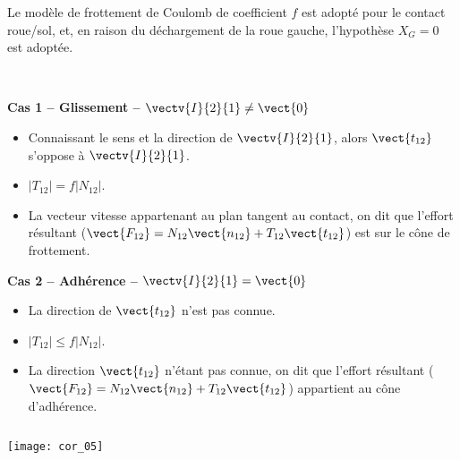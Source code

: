 \ifprof
\else
Le modèle de frottement de Coulomb de coefficient $f$ est adopté pour le contact roue/sol, et, en raison du déchargement de la roue gauche, l’hypothèse $X_G = 0$ est adoptée.
\fi

\ifprof
\begin{corrige}~\\

\noindent\begin{minipage}[t]{.33\linewidth}
\begin{center}
\textbf{Cas 1 -- Glissement -- $\vectv{I}{2}{1}\neq \vect{0}$}
\end{center}

\begin{itemize}
\item Connaissant le sens et la direction de $\vectv{I}{2}{1}$, alors $\vect{t_{12}}$ s'oppose à $\vectv{I}{2}{1}$.
\item $|T_{12}| = f |N_{12}|$.
\item La vecteur vitesse appartenant au plan tangent au contact, on dit que l'effort résultant ($\vect{F_{12}}=N_{12} \vect{n_{12}}+T_{12} \vect{t_{12}}$) est sur le cône de frottement. 
\end{itemize}
\end{minipage}\hfill
\begin{minipage}[t]{.35\linewidth}
\begin{center}
\textbf{Cas 2 -- Adhérence -- $\vectv{I}{2}{1} = \vect{0}$}
\end{center}

\begin{itemize}
\item La direction de $\vect{t_{12}}$ n'est pas connue. 
\item $|T_{12}| \leq f |N_{12}|$.
\item La direction $\vect{t_{12}}$ n'étant pas connue, on dit que l'effort résultant ($\vect{F_{12}}=N_{12} \vect{n_{12}}+T_{12} \vect{t_{12}}$) appartient au cône d'adhérence. 
\end{itemize}
\end{minipage}\hfill
\begin{minipage}[t]{.29\linewidth}
$\quad$
\begin{center}
\texttt{[image: cor\_05]}
\end{center}
\end{minipage}


\end{corrige}
